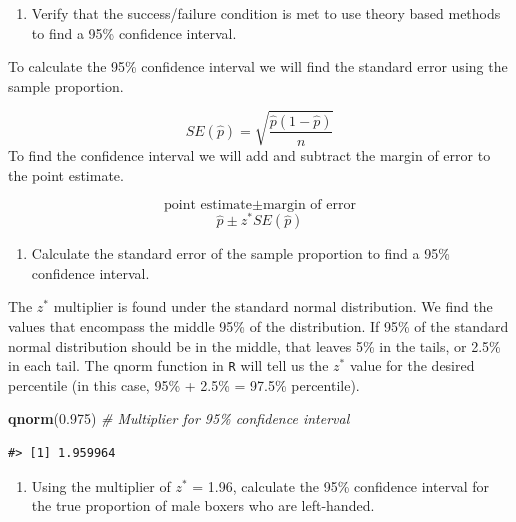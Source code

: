 \documentclass[
]{report}
\newenvironment{Shaded}{\begin{snugshade}}{\end{snugshade}}
\newcommand{\CommentTok}[1]{\textcolor[rgb]{0.56,0.35,0.01}{\textit{#1}}}
\newcommand{\FloatTok}[1]{\textcolor[rgb]{0.00,0.00,0.81}{#1}}
\newcommand{\KeywordTok}[1]{\textcolor[rgb]{0.13,0.29,0.53}{\textbf{#1}}}
\newcommand{\NormalTok}[1]{#1}
\providecommand{\tightlist}{%
  \setlength{\itemsep}{0pt}\setlength{\parskip}{0pt}}
\begin{document}
\begin{enumerate}
\def\labelenumi{\arabic{enumi}.}
\tightlist
\item
  Verify that the success/failure condition is met to use theory based methods to find a 95\% confidence interval.
\end{enumerate}

\vspace{0.5in}

To calculate the 95\% confidence interval we will find the standard error using the sample proportion.

\[SE(\hat{p}) = \sqrt{\frac{\hat{p}(1-\hat{p})}{n}}\]
To find the confidence interval we will add and subtract the margin of error to the point estimate.

\[\text{point estimate}\pm\text{margin of error}\]
\[\hat{p}\pm z^* SE(\hat{p})\]

\begin{enumerate}
\def\labelenumi{\arabic{enumi}.}
\setcounter{enumi}{1}
\tightlist
\item
  Calculate the standard error of the sample proportion to find a 95\% confidence interval.
\end{enumerate}

\vspace{0.5in}

The \(z^*\) multiplier is found under the standard normal distribution. We find the values that encompass the middle 95\% of the distribution. If 95\% of the standard normal distribution should be in the middle, that leaves 5\% in the tails, or 2.5\% in each tail. The qnorm function in \texttt{R} will tell us the \(z^*\) value for the desired percentile (in this case, 95\% + 2.5\% = 97.5\% percentile).

\begin{Shaded}
\begin{Highlighting}[]
\KeywordTok{qnorm}\NormalTok{(}\FloatTok{0.975}\NormalTok{) }\CommentTok{\# Multiplier for 95\% confidence interval}
\end{Highlighting}
\end{Shaded}

\begin{verbatim}
#> [1] 1.959964
\end{verbatim}

\begin{enumerate}
\def\labelenumi{\arabic{enumi}.}
\setcounter{enumi}{2}
\tightlist
\item
  Using the multiplier of \(z^*\) = 1.96, calculate the 95\% confidence interval for the true proportion of male boxers who are left-handed.
\end{enumerate}
\end{document}
